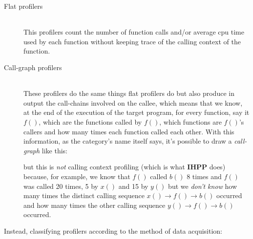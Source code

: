 \documentclass[a4paper,11pt]{report}
\begin{document}
\begin{description}
\item[Flat profilers] \hfill \\
This profilers count the number of function calls and/or average cpu time used
by each function without keeping trace of the calling context of the function.
\item[Call-graph profilers] \hfill \\
These profilers do the same things flat profilers do but also produce in output
the call-chains involved on the callee, which means that we know, at the end of
the execution of the target program, for every function, say it $f()$, which are
the functions called by $f()$, which functions are $f()$'s callers and how many
times each function called each other. With this information, as the category's
name itself says, it's possible to draw a \emph{call-graph} like this:

\begin{centering}


\end{centering}

but this is \emph{not} calling context profiling (which is what \textbf{IHPP}
does) because, for example, we know that $f()$ called $b()$ 8 times and $f()$
was called 20 times, 5 by $x()$ and 15 by $y()$ but we \emph{don't know} how
many times the distinct calling sequence $x()\rightarrow f()\rightarrow b()$
occurred and how many times the other calling sequence $y()\rightarrow
f()\rightarrow b()$ occurred.

\end{description}

\begin{flushleft}
Instead, classifying profilers according to the method of data acquisition:
\end{flushleft}
\end{document}
